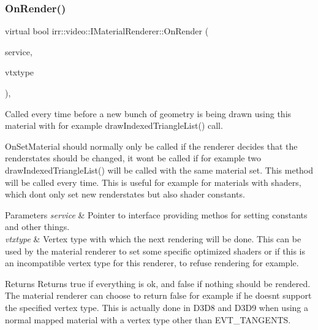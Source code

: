 \subsubsection{\texorpdfstring{On\+Render()}{OnRender()}\hspace{0.1cm}{\footnotesize\ttfamily [1/2]}}
{\footnotesize\ttfamily virtual bool irr\+::video\+::\+I\+Material\+Renderer\+::\+On\+Render (\begin{DoxyParamCaption}\item[{\hyperlink{classirr_1_1video_1_1IMaterialRendererServices}{I\+Material\+Renderer\+Services} $\ast$}]{service,  }\item[{\hyperlink{namespaceirr_1_1video_a0e3b59e025e0d0db0ed2ee0ce904deac}{E\+\_\+\+V\+E\+R\+T\+E\+X\+\_\+\+T\+Y\+PE}}]{vtxtype }\end{DoxyParamCaption})\hspace{0.3cm}{\ttfamily [inline]}, {\ttfamily [virtual]}}



Called every time before a new bunch of geometry is being drawn using this material with for example draw\+Indexed\+Triangle\+List() call. 

On\+Set\+Material should normally only be called if the renderer decides that the renderstates should be changed, it won\textquotesingle{}t be called if for example two draw\+Indexed\+Triangle\+List() will be called with the same material set. This method will be called every time. This is useful for example for materials with shaders, which don\textquotesingle{}t only set new renderstates but also shader constants. 
\begin{DoxyParams}{Parameters}
{\em service} & Pointer to interface providing methos for setting constants and other things. \\
\hline
{\em vtxtype} & Vertex type with which the next rendering will be done. This can be used by the material renderer to set some specific optimized shaders or if this is an incompatible vertex type for this renderer, to refuse rendering for example. \\
\hline
\end{DoxyParams}
\begin{DoxyReturn}{Returns}
Returns true if everything is ok, and false if nothing should be rendered. The material renderer can choose to return false for example if he doesn\textquotesingle{}t support the specified vertex type. This is actually done in D3\+D8 and D3\+D9 when using a normal mapped material with a vertex type other than E\+V\+T\+\_\+\+T\+A\+N\+G\+E\+N\+TS. 
\end{DoxyReturn}
\mbox{\label{classirr_1_1video_1_1IMaterialRenderer_a8cb6c5f93856de7586a318f14ed21a22}} 
